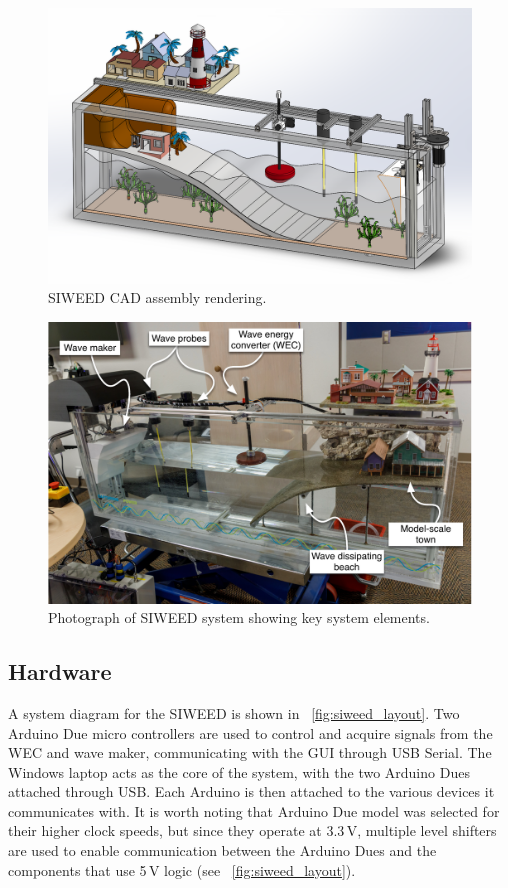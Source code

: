 \documentclass[hardware,article,submit,pdftex,moreauthors]{Definitions/mdpi}
\begin{document}
\begin{figure}[tb]
  \centering
  \includegraphics[width=1\textwidth]{diagrams/SIWEED_CAD.png}
  \caption{SIWEED CAD assembly rendering.}
  \label{fig:CAD}
\end{figure}

\begin{figure}[tb]
  \centering
  \includegraphics[width=1\textwidth]{diagrams/siweed_photo_with_callouts.pdf}
  \caption{Photograph of SIWEED system showing key system elements.}
  \label{fig:siweed_photo_with_callouts}
\end{figure}

\subsection{Hardware}
A system diagram for the SIWEED is shown in \figurename~\ref{fig:siweed_layout}.
Two Arduino Due micro controllers are used to control and acquire signals from the WEC and wave maker, communicating with the GUI through USB Serial.
The Windows laptop acts as the core of the system, with the two Arduino Dues attached through USB. 
Each Arduino is then attached to the various devices it communicates with.
It is worth noting that Arduino Due model was selected for their higher clock speeds, but since they operate at 3.3\,V, multiple level shifters are used to enable communication between the Arduino Dues and the components that use 5\,V logic (see \figurename~\ref{fig:siweed_layout}).
\end{document}
